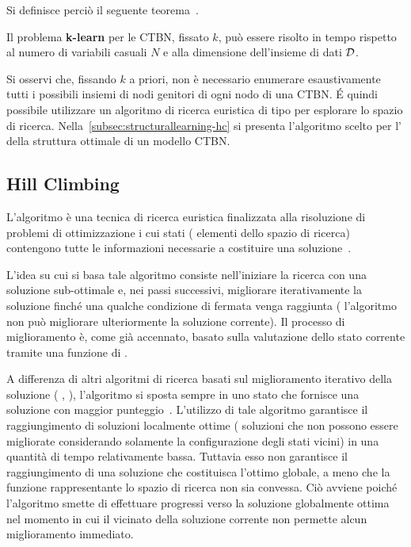 Si definisce perciò il seguente teorema~\citep{Nodelman2002}.
\begin{teorema}
Il problema \textbf{k-learn} per le \acl{CTBN}, fissato $k$, può essere risolto in tempo  rispetto al numero di variabili casuali $N$ e alla dimensione dell'insieme di dati $\mathcal{D}$.
\end{teorema}

Si osservi che, fissando $k$ a priori, non è necessario enumerare esaustivamente tutti i possibili insiemi di nodi genitori di ogni nodo di una \acs{CTBN}. \'E quindi possibile utilizzare un algoritmo di ricerca euristica di tipo \emph{} per esplorare lo spazio di ricerca. Nella~\autoref{subsec:structurallearning-hc} si presenta l'algoritmo scelto per l' della struttura ottimale di un modello \acs{CTBN}.

\subsection{Hill Climbing}\label{subsec:structurallearning-hc}
L'algoritmo \emph{\keyword{\hc{}}} è una tecnica di ricerca euristica finalizzata alla risoluzione di problemi di ottimizzazione i cui stati (\ie{} elementi dello spazio di ricerca) contengono tutte le informazioni necessarie a costituire una soluzione~\citep{Russel2003}.

L'idea su cui si basa tale algoritmo consiste nell'iniziare la ricerca con una soluzione sub-ottimale e, nei passi successivi, migliorare iterativamente la soluzione finché una qualche condizione di fermata venga raggiunta (\eg{} l'algoritmo non può migliorare ulteriormente la soluzione corrente). Il processo di miglioramento è, come già accennato, basato sulla valutazione dello stato corrente tramite una funzione di .

A differenza di altri algoritmi di ricerca basati sul miglioramento iterativo della soluzione (\eg{} \emph{}, \emph{}), l'algoritmo \emph{\keyword{\hc{}}} si sposta sempre in uno stato che fornisce una soluzione con maggior punteggio~\citep{Russel2003}. L'utilizzo di tale algoritmo garantisce il raggiungimento di soluzioni localmente ottime (\ie{} soluzioni che non possono essere migliorate considerando solamente la configurazione degli stati vicini) in una quantità di tempo relativamente bassa. Tuttavia esso non garantisce il raggiungimento di una soluzione che costituisca l'ottimo globale, a meno che la funzione rappresentante lo spazio di ricerca non sia convessa. Ciò avviene poiché l'algoritmo smette di effettuare progressi verso la soluzione globalmente ottima nel momento in cui il vicinato della soluzione corrente non permette alcun miglioramento immediato.

